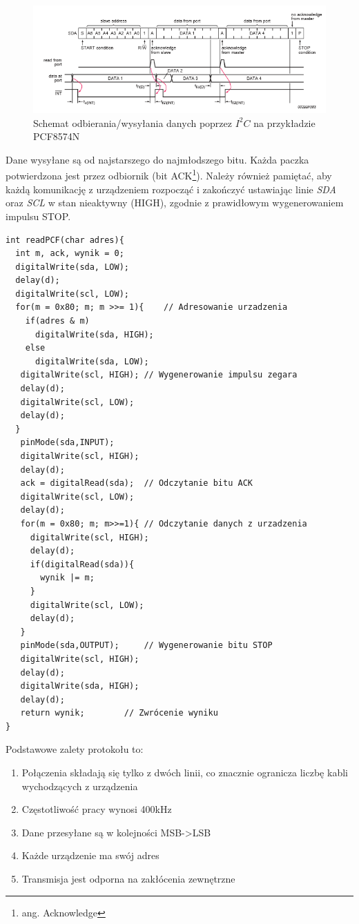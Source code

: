 \documentclass{xmgr}
\begin{document}
\begin{figure}[!h]
    \centering
    \includegraphics[height=0.25\textheight]{images/read_i2c.png}
    \caption{Schemat odbierania/wysyłania danych poprzez $I^2C$ na przykładzie PCF8574N\label{$I^2C$}}
\end{figure}

Dane wysyłane są od najstarszego do najmłodszego bitu. Każda paczka potwierdzona jest przez odbiornik (bit ACK\footnote{ang. Acknowledge}). Należy również pamiętać, aby każdą komunikację z urządzeniem rozpocząć i zakończyć ustawiając linie \emph{SDA} oraz \emph{SCL} w stan nieaktywny (HIGH), zgodnie z prawidłowym wygenerowaniem impulsu STOP.

\begin{lstlisting}[label=bot-dirs-alg,caption=Odebranie danych z użyciem protokołu $I^2C$ na przykładzie PCF8574N]
int readPCF(char adres){
  int m, ack, wynik = 0;
  digitalWrite(sda, LOW);
  delay(d);
  digitalWrite(scl, LOW);
  for(m = 0x80; m; m >>= 1){	// Adresowanie urzadzenia
    if(adres & m)
      digitalWrite(sda, HIGH);
    else
      digitalWrite(sda, LOW);
   digitalWrite(scl, HIGH);	// Wygenerowanie impulsu zegara
   delay(d);
   digitalWrite(scl, LOW);
   delay(d);
  }
   pinMode(sda,INPUT);
   digitalWrite(scl, HIGH);
   delay(d);
   ack = digitalRead(sda);	// Odczytanie bitu ACK
   digitalWrite(scl, LOW);
   delay(d);
   for(m = 0x80; m; m>>=1){	// Odczytanie danych z urzadzenia
     digitalWrite(scl, HIGH);
     delay(d);
     if(digitalRead(sda)){
       wynik |= m;
     }
     digitalWrite(scl, LOW);
     delay(d);
   }
   pinMode(sda,OUTPUT);		// Wygenerowanie bitu STOP
   digitalWrite(scl, HIGH);
   delay(d);
   digitalWrite(sda, HIGH);
   delay(d);
   return wynik;		// Zwrócenie wyniku
}
\end{lstlisting}

Podstawowe zalety protokołu to:
\begin{enumerate}
	\item Połączenia składają się tylko z dwóch linii, co znacznie ogranicza liczbę kabli wychodzących z urządzenia
	\item Częstotliwość pracy wynosi 400kHz
	\item Dane przesyłane są w kolejności MSB->LSB
	\item Każde urządzenie ma swój adres	
	\item Transmisja jest odporna na zakłócenia zewnętrzne
\end{enumerate}
\end{document}
